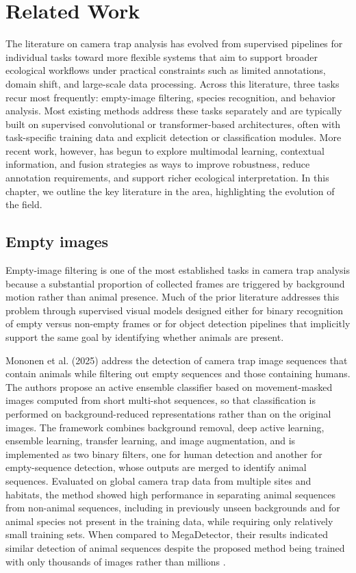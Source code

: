 \chapter{Related Work}\label{cap:related_work}

The literature on camera trap analysis has evolved from supervised pipelines for individual tasks toward more flexible systems that aim to support broader ecological workflows under practical constraints such as limited annotations, domain shift, and large-scale data processing. Across this literature, three tasks recur most frequently: empty-image filtering, species recognition, and behavior analysis. Most existing methods address these tasks separately and are typically built on supervised convolutional or transformer-based architectures, often with task-specific training data and explicit detection or classification modules. More recent work, however, has begun to explore multimodal learning, contextual information, and fusion strategies as ways to improve robustness, reduce annotation requirements, and support richer ecological interpretation. In this chapter, we outline the key literature in the area, highlighting the evolution of the field.

\section{Empty images}

Empty-image filtering is one of the most established tasks in camera trap analysis because a substantial proportion of collected frames are triggered by background motion rather than animal presence. Much of the prior literature addresses this problem through supervised visual models designed either for binary recognition of empty versus non-empty frames or for object detection pipelines that implicitly support the same goal by identifying whether animals are present.

Mononen et al. (2025) \cite{mononen2025active} address the detection of camera trap image sequences that contain animals while filtering out empty sequences and those containing humans. The authors propose an active ensemble classifier based on movement-masked images computed from short multi-shot sequences, so that classification is performed on background-reduced representations rather than on the original images. The framework combines background removal, deep active learning, ensemble learning, transfer learning, and image augmentation, and is implemented as two binary filters, one for human detection and another for empty-sequence detection, whose outputs are merged to identify animal sequences. Evaluated on global camera trap data from multiple sites and habitats, the method showed high performance in separating animal sequences from non-animal sequences, including in previously unseen backgrounds and for animal species not present in the training data, while requiring only relatively small training sets. When compared to MegaDetector, their results indicated similar detection of animal sequences despite the proposed method being trained with only thousands of images rather than millions \cite{mononen2025active}.


